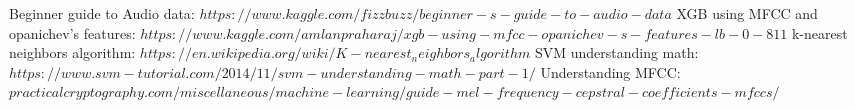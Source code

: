 \documentclass{article}
\begin{document}
\begin{thebibliography}{9}
  Beginner guide to Audio data: $https://www.kaggle.com/fizzbuzz/beginner-s-guide-to-audio-data$
  XGB using MFCC and opanichev's features: $https://www.kaggle.com/amlanpraharaj/xgb-using-mfcc-opanichev-s-features-lb-0-811$
  k-nearest neighbors algorithm: $https://en.wikipedia.org/wiki/K-nearest_neighbors_algorithm$
  SVM understanding math: $https://www.svm-tutorial.com/2014/11/svm-understanding-math-part-1/$
  Understanding MFCC: $practicalcryptography.com/miscellaneous/machine-learning/guide-mel-frequency-cepstral-coefficients-mfccs/$
\end{thebibliography}
\end{document}

